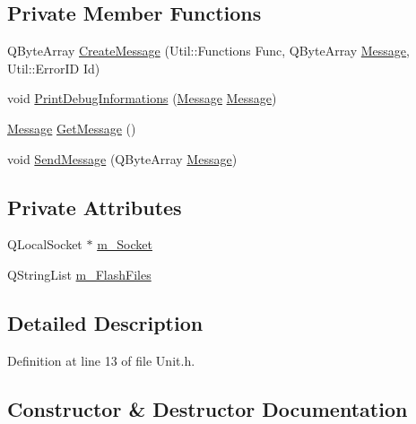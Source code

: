 \subsection*{Private Member Functions}
\begin{DoxyCompactItemize}
\item 
Q\+Byte\+Array \hyperlink{class_r_w_1_1_c_o_r_e_1_1_unit_af72c1a6126550786eac95439262b9718}{Create\+Message} (Util\+::\+Functions Func, Q\+Byte\+Array \hyperlink{namespace_r_w_1_1_c_o_r_e_a571834b44d0e3fab58aa6abfe5a02988}{Message}, Util\+::\+Error\+ID Id)
\item 
void \hyperlink{class_r_w_1_1_c_o_r_e_1_1_unit_afe8b61eae2147c5ed409f16f801947a8}{Print\+Debug\+Informations} (\hyperlink{namespace_r_w_1_1_c_o_r_e_a571834b44d0e3fab58aa6abfe5a02988}{Message} \hyperlink{namespace_r_w_1_1_c_o_r_e_a571834b44d0e3fab58aa6abfe5a02988}{Message})
\item 
\hyperlink{namespace_r_w_1_1_c_o_r_e_a571834b44d0e3fab58aa6abfe5a02988}{Message} \hyperlink{class_r_w_1_1_c_o_r_e_1_1_unit_a0bd62b49be93e3e162ba08ac1c02c027}{Get\+Message} ()
\item 
void \hyperlink{class_r_w_1_1_c_o_r_e_1_1_unit_a5d5854e3dde478770720f302289dbddd}{Send\+Message} (Q\+Byte\+Array \hyperlink{namespace_r_w_1_1_c_o_r_e_a571834b44d0e3fab58aa6abfe5a02988}{Message})
\end{DoxyCompactItemize}
\subsection*{Private Attributes}
\begin{DoxyCompactItemize}
\item 
Q\+Local\+Socket $\ast$ \hyperlink{class_r_w_1_1_c_o_r_e_1_1_unit_a66126526b69f4c9f9559613e921bf724}{m\+\_\+\+Socket}
\item 
Q\+String\+List \hyperlink{class_r_w_1_1_c_o_r_e_1_1_unit_a7e19e658c1f9cac1db592ac5d29151a2}{m\+\_\+\+Flash\+Files}
\end{DoxyCompactItemize}


\subsection{Detailed Description}


Definition at line 13 of file Unit.\+h.



\subsection{Constructor \& Destructor Documentation}
\hypertarget{class_r_w_1_1_c_o_r_e_1_1_unit_a28b0dc765cd31094c074dbad370055bb}{}\label{class_r_w_1_1_c_o_r_e_1_1_unit_a28b0dc765cd31094c074dbad370055bb} 
